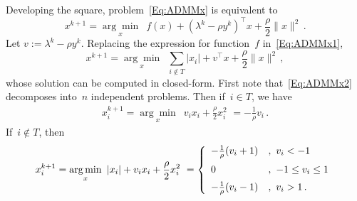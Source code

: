 \documentclass[letter,10pt]{article}
\theoremstyle{definition}
\theoremstyle{nonumberplain}
\newcommand{\mypar}[1]{\bigskip\noindent {\bf #1.}}
\begin{document}
	\mypar{Problem in \boldmath{$x$}} Developing the square, problem~\eqref{Eq:ADMMx} is equivalent to
	\begin{equation}\label{Eq:ADMMx1}
		x^{k+1} = \underset{x}{\arg\min} \,\,\, f(x) + (\lambda^k - \rho y^k)^\top x + \frac{\rho}{2}\|x\|^2\,.
	\end{equation}
	Let $v:= \lambda^k - \rho y^k$. Replacing the expression for function~$f$ in~\eqref{Eq:ADMMx1},
	\begin{equation}\label{Eq:ADMMx2}
		x^{k+1} = \underset{x}{\arg\min} \,\,\, \sum_{i \not\in T}|x_i| + v^\top x + \frac{\rho}{2}\|x\|^2\,,
	\end{equation}
	whose solution can be computed in closed-form. First note that~\eqref{Eq:ADMMx2} decomposes into~$n$ independent problems. Then if~$i \in T$, we have
	\begin{align*}
			x_i^{k+1} 
		= 
			\underset{x}{\arg\min} \,\,\, v_i x_i + \frac{\rho}{2}x_i^2
		\,\,=
			-\frac{1}{\rho}v_i\,.
	\end{align*}
	If~$i \not\in T$, then
	\begin{align*}
			x_i^{k+1} 
		= 
			\underset{x}{\arg\min} \,\,\, |x_i| + v_i x_i + \frac{\rho}{2}x_i^2
		\,\,
		=
		\left\{
			\begin{array}{ll}
				-\frac{1}{\rho}(v_i + 1) &,\,\, v_i < -1
				\vspace{0.2cm}
				\\
				0                        &,\,\, -1\leq v_i \leq 1 
				\vspace{0.2cm}
				\\
				-\frac{1}{\rho}(v_i - 1) &,\,\, v_i > 1\,.
			\end{array}
		\right.
	\end{align*}
\end{document}
